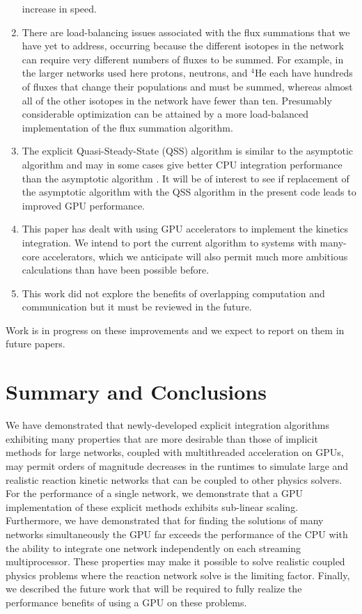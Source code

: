 \documentclass[]{elsart}
\newcommand{\isotope}[2]{\mbox{$^{#1}$#2}}
\begin{document}
\begin{enumerate}
increase in speed.
\item
There are load-balancing issues associated with the flux summations that we have 
yet to address, occurring because the different isotopes in the network can 
require very different numbers of fluxes to be summed.  For example, in the 
larger networks used here protons, neutrons, and \isotope{4}{He}  each have 
hundreds of fluxes that change their populations and must be summed, whereas 
almost all of the other isotopes in the network have fewer than ten.  Presumably 
considerable optimization can be attained by a more load-balanced 
implementation 
of the flux summation algorithm.
\item
The explicit Quasi-Steady-State (QSS) algorithm is  similar to the asymptotic 
algorithm and may in some cases give better CPU integration performance than the 
asymptotic algorithm \cite{guidQSS}.  It will be of interest to see if 
replacement of the asymptotic algorithm with the QSS algorithm in the present 
code leads to improved GPU performance.
\item
This paper has dealt with using GPU accelerators to implement the kinetics 
integration.  We intend to port the current algorithm to systems with many-core 
accelerators, which we anticipate will also permit much more ambitious 
calculations than have been possible before.
\item 
This work did not explore the benefits of overlapping computation and
communication but it must be reviewed in the future.
\end{enumerate}

\noindent
Work is in progress on these improvements and we expect to report on 
them in future papers.


\section{Summary and Conclusions}

We have demonstrated that newly-developed explicit integration algorithms 
exhibiting many properties that are more desirable than those of implicit 
methods for large networks, coupled with multithreaded acceleration on GPUs, may 
permit orders of magnitude decreases in the runtimes to simulate large and 
realistic reaction kinetic networks that can be coupled to other physics 
solvers.  For the performance of a single network, we demonstrate that a GPU
implementation of these explicit methods exhibits sub-linear scaling.
Furthermore, we have demonstrated that for finding the solutions of 
many networks simultaneously the GPU far exceeds the performance of the CPU
with the ability to integrate one network independently on each streaming 
multiprocessor. These properties may make it possible to solve realistic 
coupled physics problems where the reaction network solve is the limiting 
factor. Finally, we described the future work that will be required to fully 
realize the performance benefits of using a GPU on these problems.
\end{document}
